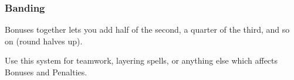 \subsubsection{Banding}
Bonuses together lets you add half of the second, a quarter of the third, and so on
(round halves up).

Use this system for teamwork, layering spells, or anything else which affects Bonuses and Penalties.
